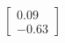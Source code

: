 \documentclass[preview]{standalone}
\begin{document}
\begin{align*}
\begin{bmatrix} 0.09 \\ -0.63 \end{bmatrix}
\end{align*}
\end{document}
